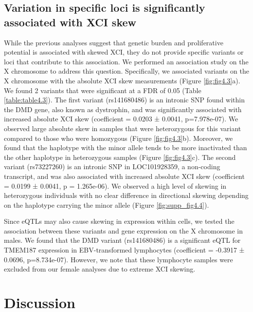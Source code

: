 


\subsection{Variation in specific loci is significantly associated with XCI skew}

While the previous analyses suggest that genetic burden and proliferative potential is associated with skewed XCI, they do not provide specific variants or loci that contribute to this association. We performed an association study on the X chromosome to address this question. Specifically, we associated variants on the X chromosome with the absolute XCI skew measurements (Figure \ref{fig:fig4.3}a). We found 2 variants that were significant at a FDR of 0.05 (Table \ref{table:table4.3}). The first variant (rs141680486) is an intronic SNP found within the DMD gene, also known as dystrophin, and was significantly associated with increased absolute XCI skew (coefficient = 0.0203 ± 0.0041, p=7.978e-07). We observed large absolute skew in samples that were heterozygous for this variant compared to those who were homozygous (Figure \ref{fig:fig4.3}b). Moreover, we found that the haplotype with the minor allele tends to be more inactivated than the other haplotype in heterozygous samples (Figure \ref{fig:fig4.3}c). The second variant (rs73227260) is an intronic SNP in LOC101928359, a non-coding transcript,  and was also associated with increased absolute XCI skew (coefficient = 0.0199 ± 0.0041, p = 1.265e-06). We observed a high level of skewing in heterozygous individuals with no clear difference in directional skewing depending on the haplotype carrying the minor allele (Figure \ref{fig:supp_fig4.4}).

Since eQTLs may also cause skewing in expression within cells, we tested the association between these variants and gene expression on the X chromosome in males. We found that the DMD variant (rs141680486) is a significant eQTL for TMEM187 expression in EBV-transformed lymphocytes (coefficient = -0.3917 ± 0.0696, p=8.734e-07). However, we note that these lymphocyte samples were excluded from our female analyses due to extreme XCI skewing. 





\section{Discussion}

